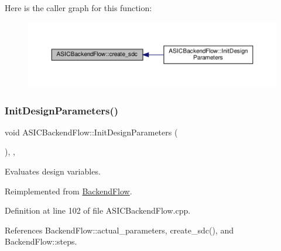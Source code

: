 Here is the caller graph for this function\+:
\nopagebreak
\begin{figure}[H]
\begin{center}
\leavevmode
\includegraphics[width=350pt]{d2/d69/classASICBackendFlow_a3ae8c5df3e6ab613cee0e21df62f26a1_icgraph}
\end{center}
\end{figure}
\mbox{\label{classASICBackendFlow_a57e6be510f2b198c19d47cc6e7e2d0ab}} 
\subsubsection{\texorpdfstring{Init\+Design\+Parameters()}{InitDesignParameters()}}
{\footnotesize\ttfamily void A\+S\+I\+C\+Backend\+Flow\+::\+Init\+Design\+Parameters (\begin{DoxyParamCaption}{ }\end{DoxyParamCaption})\hspace{0.3cm}{\ttfamily [override]}, {\ttfamily [private]}, {\ttfamily [virtual]}}



Evaluates design variables. 



Reimplemented from \hyperlink{classBackendFlow_a367d9917dc257ed6aa0bb5e97f57d2d4}{Backend\+Flow}.



Definition at line 102 of file A\+S\+I\+C\+Backend\+Flow.\+cpp.



References Backend\+Flow\+::actual\+\_\+parameters, create\+\_\+sdc(), and Backend\+Flow\+::steps.

